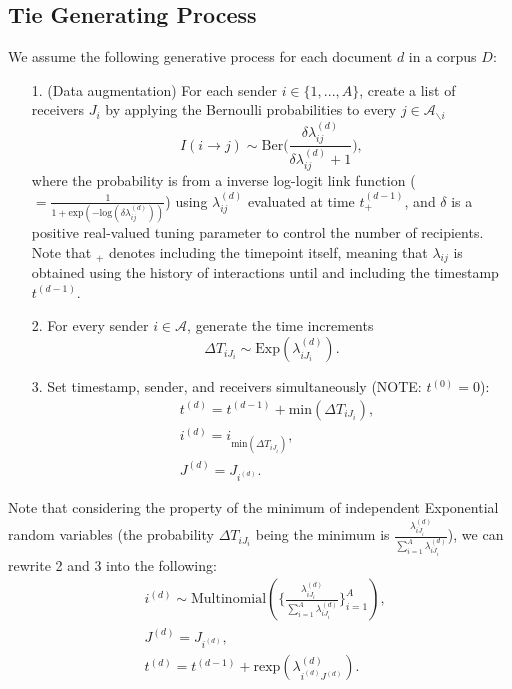\documentclass[a4paper]{article}
\begin{document}
\subsection{Tie Generating Process}\label{subsec: Tie Generating Process}
We assume the following generative process for each document $d$ in a corpus $D$:
\begin{itemize}
	\item[1.] (Data augmentation) For each sender $i \in \{1,...,A\}$, create a list of receivers $J_i$ by applying the Bernoulli probabilities to every $j \in \mathcal{A}_{\backslash i}$
	\begin{equation} I(i \rightarrow j) \sim \mbox{Ber}\Big(\frac{\delta\lambda^{(d)}_{ij}}{\delta\lambda^{(d)}_{ij}+1}\Big),
	\end{equation}
	where the probability is from a inverse log-logit link function ($=\frac{1}{1 + \mbox{exp}(-\mbox{log}(\delta\lambda^{(d)}_{ij}))}$) using $\lambda^{(d)}_{ij}$ evaluated at time $t_+^{(d-1)}$, and $\delta$ is a positive real-valued tuning parameter to control the number of recipients. Note that $_+$ denotes including the timepoint itself, meaning that $\lambda_{ij}$ is obtained using the history of interactions until and including the timestamp $t^{(d-1)}$. 
	\item[2.] For every sender $i \in \mathcal{A}$, generate the time increments \begin{equation}
\Delta T_{i{J_i}} \sim \mbox{Exp}(\lambda_{i{J_i}}^{(d)}).
	\end{equation}
	 	 \item[3.] Set timestamp, sender, and receivers simultaneously (NOTE: $t^{(0)}=0$):
	 	 \begin{equation}
	 	 \begin{aligned}
	 	 &t^{(d)} = t^{(d-1)}+\mbox{min}(\Delta T_{i{J_i}}),\\
	 	  &i^{(d)} = i_{\mbox{min}(\Delta T_{i{J_i}})}, \\
	 	  &J^{(d)} = J_{i^{(d)}}.
	 	  \end{aligned}
	 	 \end{equation}
\end{itemize}
Note that considering the property of the minimum of independent Exponential random variables (the probability $\Delta T_{i{J_i}}$ being the minimum is $\frac{\lambda_{i{J_i}}^{(d)}}{\sum_{i=1}^A\lambda_{i{J_i}}^{(d)}}$), we can rewrite 2 and 3 into the following:
	 \begin{equation}
	 \begin{aligned}
	 &i^{(d)} \sim {\mbox{Multinomial}(\{\frac{\lambda_{i{J_i}}^{(d)}}{\sum_{i=1}^A\lambda_{i{J_i}}^{(d)}}\}_{i=1}^A)}, \\
	 &J^{(d)} = J_{i^{(d)}},\\
	 &t^{(d)} = t^{(d-1)}+\mbox{rexp}(\lambda_{i^{(d)}J^{(d)}}^{(d)}).\\
	 \end{aligned}
	 \end{equation}
\end{document}
